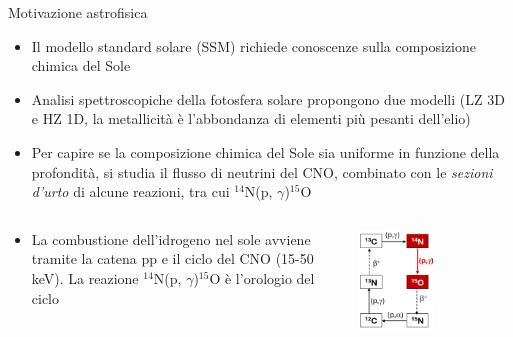 \documentclass [xcolor=svgnames, 9pt] {beamer}
\begin{document}
\begin{frame}{Motivazione astrofisica}
	\begin{itemize}
		\item Il modello standard solare (SSM) richiede conoscenze sulla composizione chimica del Sole
		\item Analisi spettroscopiche della fotosfera solare propongono due modelli (LZ 3D e HZ 1D, la metallicità è l'abbondanza di elementi più pesanti dell'elio)
		
		\item Per capire se la composizione chimica del Sole sia uniforme in funzione della profondità, si studia il flusso di neutrini del CNO, combinato con le \emph{sezioni d'urto} di alcune reazioni, tra cui $^{14}$N(p, $\gamma$)$^{15}$O
	\end{itemize}
	
	\begin{columns}
		\begin{column}{0.5\textwidth}
			\begin{itemize}
				\item La combustione dell'idrogeno nel sole avviene tramite la catena pp e il ciclo del CNO (15-50 keV). La reazione $^{14}$N(p, $\gamma$)$^{15}$O è l'orologio del ciclo
			\end{itemize}
		\end{column}
		\begin{column}{0.5\textwidth}
			\centering
			\includegraphics[width=0.5\textwidth]{img/CNO.png}
		\end{column}
	\end{columns}
\end{frame}
\end{document}
